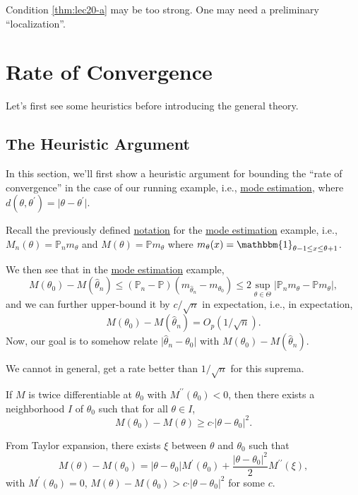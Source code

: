 \begin{remark}
	Condition \autoref{thm:lec20-a} may be too strong. One may need a preliminary ``localization''.
\end{remark}

\section{Rate of Convergence}
Let's first see some heuristics before introducing the general theory.

\subsection{The Heuristic Argument}
In this section, we'll first show a heuristic argument for bounding the ``rate of convergence'' in the case of our running example, i.e., \hyperref[eg:mode-estimation]{mode estimation}, where \(d(\theta , \theta ^{\prime} ) = \vert \theta - \theta ^{\prime} \vert \).

\begin{prev}
	Recall the previously defined \hyperref[not:M-estimation]{notation} for the \hyperref[eg:mode-estimation]{mode estimation} example, i.e., \(M_n(\theta ) = \mathbb{P} _n m_\theta \) and \(M(\theta ) = \mathbb{P} m_\theta \) where \(m_\theta (x) = \mathbbm{1}_{\theta -1 \leq x \leq \theta +1} \).
\end{prev}

We then see that in the \hyperref[eg:mode-estimation]{mode estimation} example,
\[
	M(\theta _0) - M(\hat{\theta} _n)
	\leq (\mathbb{P} _n - \mathbb{P} ) (m_{\hat{\theta } _n } - m_{\theta _0})
	\leq 2 \sup _{\theta \in \Theta } \vert \mathbb{P} _n m_\theta - \mathbb{P} m_\theta \vert,
\]
and we can further upper-bound it by \(c / \sqrt{n} \) in expectation, i.e., in expectation,
\[
	M(\theta _0) - M(\hat{\theta } _n ) = O_p(1 / \sqrt{n} ).
\]
Now, our goal is to somehow relate \(\vert \hat{\theta} _n - \theta _0 \vert \) with \(M(\theta _0) - M(\hat{\theta} _n)\).

\begin{note}
	We cannot in general, get a rate better than \(1 / \sqrt{n} \) for this suprema.
\end{note}

\begin{remark}
	If \(M\) is twice differentiable at \(\theta _0\) with \(M^{\prime\prime} (\theta _0) < 0\), then there exists a neighborhood \(I\) of \(\theta _0\) such that for all \(\theta \in I\),
	\[
		M(\theta _0) - M(\theta ) \geq c \cdot \vert \theta - \theta _0 \vert ^2.
	\]
\end{remark}
\begin{explanation}
	From Taylor expansion, there exists \(\xi \) between \(\theta \) and \(\theta _0\) such that
	\[
		M(\theta ) - M(\theta _0)
		=  \vert \theta - \theta _0 \vert M^{\prime} (\theta _0) + \frac{ \vert \theta - \theta _0 \vert ^2}{2} M^{\prime\prime} (\xi ),
	\]
	with \(M^{\prime} (\theta _0) = 0\), \(M(\theta ) - M(\theta _0) > c \cdot \vert \theta - \theta _0 \vert ^2\) for some \(c\).
\end{explanation}


